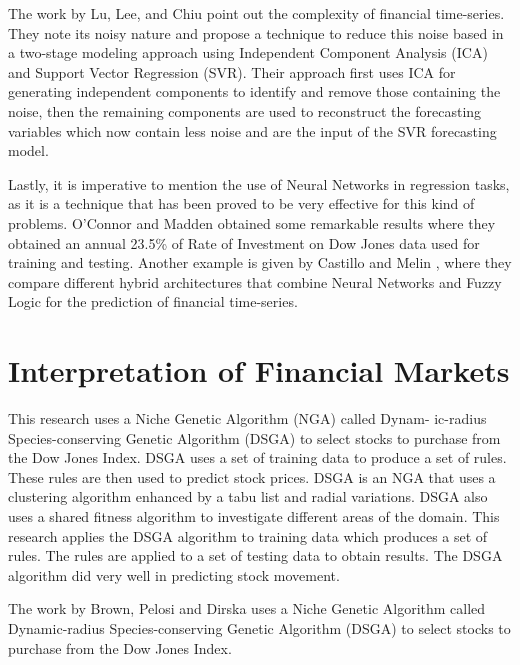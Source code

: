 The work by Lu, Lee, and Chiu \cite{Lu2009} point out the complexity of
financial time-series. They note its noisy nature and propose a technique to
reduce this noise based in a two-stage modeling approach using Independent
Component Analysis (ICA) and Support Vector Regression (SVR). Their approach
first uses ICA for generating independent components to identify and remove
those containing the noise, then the remaining components are used to
reconstruct the forecasting variables which now contain less noise and are the
input of the SVR forecasting model.


Lastly, it is imperative to mention the use of Neural Networks in regression
tasks, as it is a technique that has been proved to be very effective for this
kind of problems. O'Connor and Madden \cite{Connor2005} obtained some remarkable
results where they obtained an annual 23.5\% of Rate of Investment on Dow Jones
data used for training and testing. Another example is given by Castillo and
Melin \cite{castillo2001simulation}, where they compare different hybrid
architectures that combine Neural Networks and Fuzzy Logic for the prediction of
financial time-series.

\section{Interpretation of Financial Markets}
\label{section:interpretation-of-financial-markets}

\cite{Brown2013} This research uses a Niche Genetic Algorithm (NGA) called
Dynam- ic-radius Species-conserving Genetic Algorithm (DSGA) to select stocks to
purchase from the Dow Jones Index. DSGA uses a set of training data to produce a
set of rules. These rules are then used to predict stock prices. DSGA is an NGA
that uses a clustering algorithm enhanced by a tabu list and radial
variations. DSGA also uses a shared fitness algorithm to investigate different
areas of the domain. This research applies the DSGA algorithm to training data
which produces a set of rules. The rules are applied to a set of testing data to
obtain results. The DSGA algorithm did very well in predicting stock movement.

The work by Brown, Pelosi and Dirska uses a Niche Genetic Algorithm called
Dynamic-radius Species-conserving Genetic Algorithm (DSGA) to select stocks to
purchase from the Dow Jones Index.


